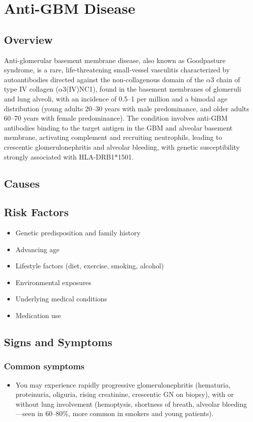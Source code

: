\chapter{Anti-GBM Disease}
\label{sec:Anti-GBM Disease (Goodpasture Syndrome)}

\section{Overview}
Anti-glomerular basement membrane disease, also known as Goodpasture syndrome, is a rare, life-threatening small-vessel vasculitis characterized by autoantibodies directed against the non-collagenous domain of the $\alpha$3 chain of type IV collagen ($\alpha$3(IV)NC1), found in the basement membranes of glomeruli and lung alveoli, with an incidence of 0.5--1 per million and a bimodal age distribution (young adults 20--30 years with male predominance, and older adults 60--70 years with female predominance). The condition involves anti-GBM antibodies binding to the target antigen in the GBM and alveolar basement membrane, activating complement and recruiting neutrophils, leading to crescentic glomerulonephritis and alveolar bleeding, with genetic susceptibility strongly associated with HLA-DRB1*1501.
\section{Causes}
\section{Risk Factors}

\begin{itemize}[noitemsep]
  \item Genetic predisposition and family history
  \item Advancing age
  \item Lifestyle factors (diet, exercise, smoking, alcohol)
  \item Environmental exposures
  \item Underlying medical conditions
  \item Medication use
\end{itemize}
\section{Signs and Symptoms}

\subsection{Common symptoms}
\begin{itemize}[noitemsep]
  \item You may experience rapidly progressive glomerulonephritis (hematuria, proteinuria, oliguria, rising creatinine, crescentic GN on biopsy), with or without lung involvement (hemoptysis, shortness of breath, alveolar bleeding---seen in 60--80\%, more common in smokers and young patients). 
  \end{itemize}

